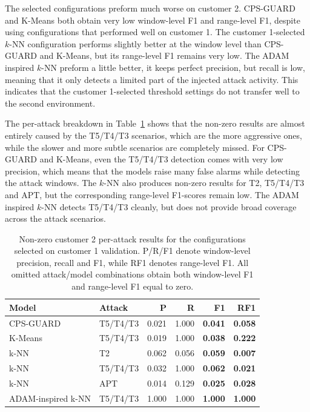 The selected configurations preform much worse on customer 2. CPS-GUARD and K-Means both obtain very low window-level F1 and range-level F1, despite using configurations that performed well on customer 1. The customer 1-selected $k$-NN configuration performs slightly better at the window level than CPS-GUARD and K-Means, but its range-level F1 remains very low. The ADAM inspired $k$-NN preform a little better, it keeps perfect precision, but recall is low, meaning that it only detects a limited part of the injected attack activity. This indicates that the customer 1-selected threshold settings do not transfer well to the second environment.


The per-attack breakdown in Table~\ref{tab:customer2_c1_selected_per_attack_nonzero} shows that the non-zero results are almost entirely caused by the T5/T4/T3 scenarios, which are the more aggressive ones, while the slower and more subtle scenarios are completely missed. For CPS-GUARD and K-Means, even the T5/T4/T3 detection comes with very low precision, which means that the models raise many false alarms while detecting the attack windows. The $k$-NN also produces non-zero results for T2, T5/T4/T3 and APT, but the corresponding range-level F1-scores remain low. The ADAM inspired $k$-NN detects T5/T4/T3 cleanly, but does not provide broad coverage across the attack scenarios.
\begin{table}[htbp]
\centering
\small
\caption{Non-zero customer 2 per-attack results for the configurations selected on customer 1 validation. P/R/F1 denote window-level precision, recall and F1, while RF1 denotes range-level F1. All omitted attack/model combinations obtain both window-level F1 and range-level F1 equal to zero.}
\renewcommand{\arraystretch}{1.15}
\setlength{\tabcolsep}{5pt}
\begin{tabular}{l l r r r r}
\toprule
Model & Attack & P & R & \textbf{F1} & \textbf{RF1} \\
\midrule

CPS-GUARD
& T5/T4/T3
& 0.021 & 1.000 & \textbf{0.041} & \textbf{0.058} \\

K-Means
& T5/T4/T3
& 0.019 & 1.000 & \textbf{0.038} & \textbf{0.222} \\

k-NN
& T2
& 0.062 & 0.056 & \textbf{0.059} & \textbf{0.007} \\

k-NN
& T5/T4/T3
& 0.032 & 1.000 & \textbf{0.062} & \textbf{0.021} \\

k-NN
& APT
& 0.014 & 0.129 & \textbf{0.025} & \textbf{0.028} \\

ADAM-inspired k-NN
& T5/T4/T3
& 1.000 & 1.000 & \textbf{1.000} & \textbf{1.000} \\

\bottomrule
\end{tabular}

\label{tab:customer2_c1_selected_per_attack_nonzero}
\end{table}

